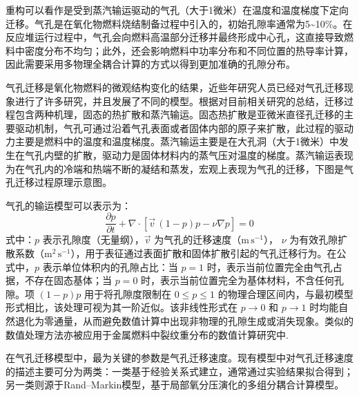 重构可以看作是受到蒸汽输运驱动的气孔（大于1微米）在温度和温度梯度下定向迁移。气孔是在氧化物燃料烧结制备过程中引入的，初始孔隙率通常为5\~{}10\%。在反应堆运行过程中，气孔会向燃料高温部分迁移并最终形成中心孔，这直接导致燃料中密度分布不均匀；此外，还会影响燃料中功率分布和不同位置的热导率计算，因此需要采用多物理全耦合计算的方式以得到更加准确的孔隙分布。

气孔迁移是氧化物燃料的微观结构变化的结果，近些年研究人员已经对气孔迁移现象进行了许多研究，并且发展了不同的模型。根据对目前相关研究的总结\cite{kanekoCalculationProgramMIVOID1969,vanceComputerSimulationPore2017,sensKineticsPoreMovement1972,ronchiPropertiesLenticularPores1974,novasconeModelingPorosityMigration2018,wellandMatterTransportFast2020}，迁移过程包含两种机理，固态的热扩散和蒸汽输运。固态热扩散是亚微米直径孔迁移的主要驱动机制，气孔可通过沿着气孔表面或者固体内部的原子来扩散，此过程的驱动力主要是燃料中的温度和温度梯度。蒸汽输运\cite{sensKineticsPoreMovement1972}主要是在大孔洞（大于1微米）中发生在气孔内壁的扩散，驱动力是固体材料内的蒸气压对温度的梯度。蒸汽输运表现为在气孔内的冷端和热端不断的凝结和蒸发，宏观上表现为气孔的迁移，下图是气孔迁移过程原理示意图。

气孔的输运模型\cite{sensKineticsPoreMovement1972,novasconeModelingPorosityMigration2018}可以表示为：
\begin{equation}
	\frac{\partial p}{\partial t}
	+ \nabla \cdot \left[ \vec{v}\,(1-p)p - \nu \nabla p \right] = 0
	\label{eq:pore_transport}
\end{equation}
式中：$p$ 表示孔隙度（无量纲），$\vec{v}$ 为气孔的迁移速度（$\mathrm{m\,s^{-1}}$），
$\nu$ 为有效孔隙扩散系数（$\mathrm{m^2\,s^{-1}}$），用于表征通过表面扩散和固体扩散引起的气孔迁移行为。在公式中，$p$ 表示单位体积内的孔隙占比：当 $p=1$ 时，表示当前位置完全由气孔占据，不存在固态基体；当 $p=0$ 时，表示当前位置完全为基体材料，不含任何孔隙。项 $(1-p)p$ 用于将孔隙度限制在 $0 \leq p \leq 1$ 的物理合理区间内，与最初模型形式相比，该处理可视为其一阶近似。该非线性形式在 $p \to 0$ 和 $p \to 1$ 时均能自然退化为零通量，从而避免数值计算中出现非物理的孔隙生成或消失现象。类似的数值处理方法亦被应用于金属燃料中裂纹重分布的数值计算研究中\cite{gallowayModelingConstituentRedistribution2015}.

在气孔迁移模型中，最为关键的参数是气孔迁移速度。现有模型中对气孔迁移速度的描述主要可分为两类：一类基于经验关系式建立，通常通过实验结果拟合得到\cite{ronchiPropertiesLenticularPores1974,sensKineticsPoreMovement1972,nicholsTheoryColumnarGrain1967}；另一类则源于Rand--Markin模型\cite{olanderFundamentalAspectsNuclear1976}，基于局部氧分压演化的多组分耦合计算模型\cite{ikusawaDevelopmentVerificationThermal2014}。

